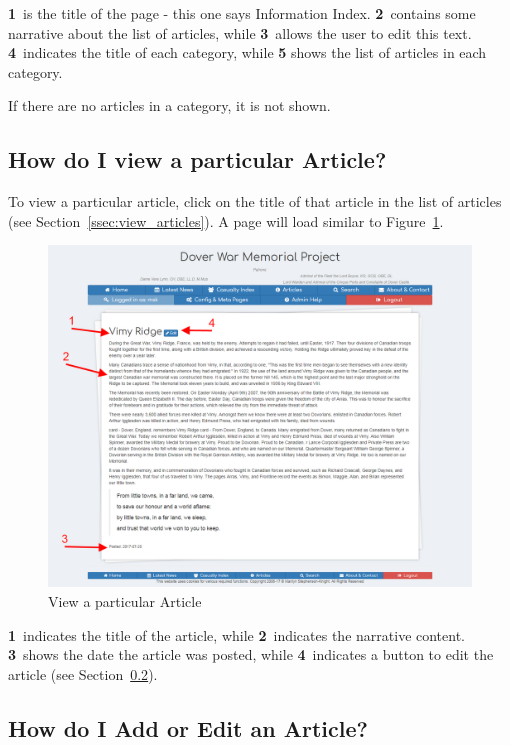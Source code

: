 \documentclass[12pt]{article}
\newcommand{\marker}[1]{\color{red}\textbf{#1}\color{black}}
\begin{document}
\marker{1}\ is the title of the page - this one says Information Index. \marker{2}\ contains some narrative about the list of articles, while \marker{3}\ allows the user to edit this text. \marker{4}\ indicates the title of each category, while \marker{5} shows the list of articles in each category.

\begin{infoBox}
If there are no articles in a category, it is not shown.
\end{infoBox}

\newpage
\FloatBarrier
\subsection{How do I view a particular Article?}\label{ssec:view_article}
To view a particular article, click on the title of that article in the list of articles (see Section~\ref{ssec:view_articles}). A page will load similar to Figure~\ref{fig:view_article}.

\begin{figure}[h]
  \centering
 \includegraphics[width=.9\textwidth]{pics/view_article.png}
	\caption{View a particular Article}\label{fig:view_article}
\end{figure}

\marker{1}\ indicates the title of the article, while \marker{2}\ indicates the narrative content. \marker{3}\ shows the date the article was posted, while \marker{4}\ indicates a button to edit the article (see Section~\ref{ssec:edit_article}).

\newpage
\FloatBarrier
\subsection{How do I Add or Edit an Article?}\label{ssec:edit_article}
\end{document}
